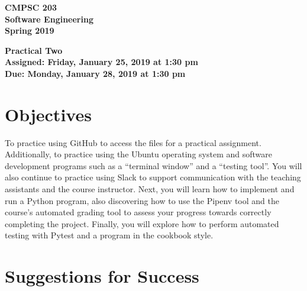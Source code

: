 \documentclass[11pt]{article}
\newcommand{\assignmentduedate}{January 28}
\newcommand{\assignmentassignedate}{January 25}
\newcommand{\assignmentnumber}{Two}
\newcommand{\labyear}{2019}
\newcommand{\labdueday}{Monday}
\newcommand{\labassignday}{Friday}
\newcommand{\labtime}{1:30 pm}
\newcommand{\assigneddate}{Assigned: \labassignday, \assignmentassignedate, \labyear{} at \labtime{}}
\newcommand{\duedate}{Due: \labdueday, \assignmentduedate, \labyear{} at \labtime{}}
\newcommand{\labtitle}[1]
{
  \begin{center}
    \begin{center}
      \bf
      CMPSC 203\\Software Engineering\\
      Spring 2019\\
      \medskip
    \end{center}
    \bf
    #1
  \end{center}
}
\begin{document}
\thispagestyle{empty}

\labtitle{Practical \assignmentnumber{} \\ \assigneddate{} \\ \duedate{}}

\section*{Objectives}

To practice using GitHub to access the files for a practical assignment.
Additionally, to practice using the Ubuntu operating system and software
development programs such as a ``terminal window'' and a ``testing tool''. You
will also continue to practice using Slack to support communication with the
teaching assistants and the course instructor. Next, you will learn how to
implement and run a Python program, also discovering how to use the Pipenv tool
and the course's automated grading tool to assess your progress towards
correctly completing the project. Finally, you will explore how to perform
automated testing with Pytest and a program in the cookbook style.

\section*{Suggestions for Success}
\end{document}
